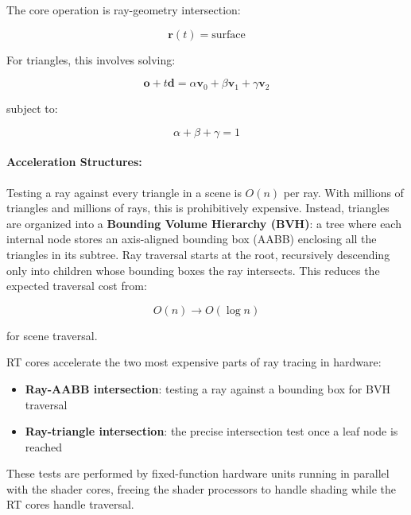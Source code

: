 \documentclass[11pt]{article}
\begin{document}
The core operation is ray-geometry intersection:

\begin{equation}
    \mathbf{r}(t) = \text{surface}
\end{equation}

For triangles, this involves solving:

\begin{equation}
    \mathbf{o} + t \mathbf{d} =
    \alpha \mathbf{v}_0 + \beta \mathbf{v}_1 + \gamma \mathbf{v}_2
\end{equation}

subject to:

\begin{equation}
    \alpha + \beta + \gamma = 1
\end{equation}

\paragraph{Acceleration Structures:}

Testing a ray against every triangle in a scene is $O(n)$ per ray. With millions of triangles and millions of rays, this is prohibitively expensive. Instead, triangles are organized into a \textbf{Bounding Volume Hierarchy (BVH)}: a tree where each internal node stores an axis-aligned bounding box (AABB) enclosing all the triangles in its subtree. Ray traversal starts at the root, recursively descending only into children whose bounding boxes the ray intersects. This reduces the expected traversal cost from:

\begin{equation}
    O(n) \rightarrow O(\log n)
\end{equation}

for scene traversal.

RT cores accelerate the two most expensive parts of ray tracing in hardware:

\begin{itemize}
    \item \textbf{Ray-AABB intersection}: testing a ray against a bounding box for BVH traversal
    \item \textbf{Ray-triangle intersection}: the precise intersection test once a leaf node is reached
\end{itemize}

These tests are performed by fixed-function hardware units running in parallel with the shader cores, freeing the shader processors to handle shading while the RT cores handle traversal.
\end{document}
